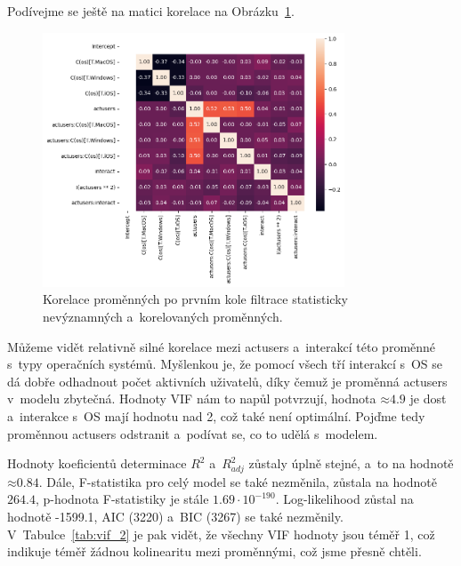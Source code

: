 \documentclass[a4paper, 11pt]{article}
\renewcommand{\texttt}[1]{{\footnotesize\ttfamily #1}}
\begin{document}
Podívejme se ještě na matici korelace na Obrázku~\ref{fig:korelace_promennych}.
\begin{figure}[ht]
    \centering
    \includegraphics[width=0.8\textwidth]{img/korelace_promennych.png}
    \caption{Korelace proměnných po prvním kole filtrace statisticky nevýznamných a~korelovaných proměnných.}
    \label{fig:korelace_promennych}
\end{figure}
Můžeme vidět relativně silné korelace mezi \texttt{actusers} a~interakcí této proměnné s~typy operačních systémů.
Myšlenkou je, že pomocí všech tří interakcí s~OS se dá dobře odhadnout počet aktivních uživatelů, díky čemuž je proměnná \texttt{actusers} v~modelu zbytečná.
Hodnoty VIF nám to napůl potvrzují, hodnota $\mathord{\approx}4.9$ je dost a~interakce s~OS mají hodnotu nad 2, což také není optimální.
Pojďme tedy proměnnou \texttt{actusers} odstranit a~podívat se, co to udělá s~modelem.

Hodnoty koeficientů determinace $R^2$ a~$R^2_{adj}$ zůstaly úplně stejné, a~to na hodnotě $\mathord{\approx}0.84$.
Dále, F-statistika pro celý model se také nezměnila, zůstala na hodnotě $264.4$, p-hodnota F-statistiky je stále $1.69 \cdot 10^{-190}$.
Log-likelihood zůstal na hodnotě -1599.1, AIC (3220) a~BIC (3267) se také nezměnily.
V~Tabulce~\ref{tab:vif_2} je pak vidět, že všechny VIF hodnoty jsou téměř 1, což indikuje téměř žádnou kolinearitu mezi proměnnými, což jsme přesně chtěli.
\end{document}

